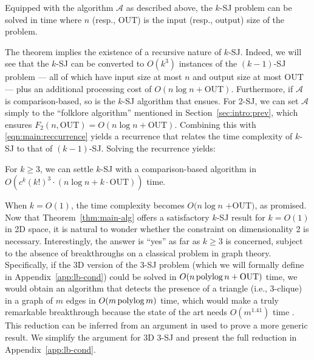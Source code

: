 \documentclass[sigconf]{acmart}
\def\A{\mathcal{A}}
\def\out{\mathrm{OUT}}
\begin{document}
\begin{theorem} \label{thm:main-recur}
    Equipped with the algorithm $\A$ as described above, the $k$-SJ problem can be solved in time
    \myeqn{
        O(k^3) \cdot \big( F_{k-1}(n, \out) + n \log n + k \cdot \out \big)
        \label{eqn:main:reccurrence}
    }
    where $n$ (resp., $\out$) is the input (resp., output) size of the problem.
\end{theorem}

The theorem implies the existence of a recursive nature of $k$-SJ. Indeed, we will see that the $k$-SJ can be converted to $O(k^3)$ instances of the $(k-1)$-SJ problem --- all of which have input size at most $n$ and output size at most $\out$ --- plus an additional processing cost of $O(n \log n + \out)$. Furthermore, if $\A$ is comparison-based, so is the $k$-SJ algorithm that ensues. For 2-SJ, we can set $\A$ simply to the ``folklore algorithm'' mentioned in Section~\ref{sec:intro:prev}, which ensures $F_2(n, \out) = O(n \log n + \out)$. Combining this with \eqref{eqn:main:reccurrence} yields a recurrence that relates the time complexity of $k$-SJ to that of $(k-1)$-SJ. Solving the recurrence yields:

\begin{theorem} \label{thm:main-alg}
    For $k \ge 3$, we can settle $k$-SJ with a comparison-based algorithm in $O( c^k (k!)^3 \cdot (n \log n + k \cdot \out))$ time.
\end{theorem}


When $k = O(1)$, the time complexity becomes $O(n \log n$ $+ \out)$, as promised. Now that Theorem~\ref{thm:main-alg} offers a satisfactory $k$-SJ result for $k = O(1)$ in 2D space, it is natural to wonder whether the constraint on dimensionality 2 is necessary. Interestingly, the answer is ``yes'' as far as $k \ge 3$ is concerned, subject to the absence of breakthroughs on a classical problem in graph theory. Specifically, if the 3D version of the 3-SJ problem (which we will formally define in Appendix~\ref{app:lb-cond}) could be solved in $O(n \polylog n + \out)$ time, we would obtain an algorithm that detects the presence of a triangle (i.e., 3-clique) in a graph of $m$ edges in $O(m \operatorname*{polylog} m)$ time, which would make a truly remarkable breakthrough because the state of the art needs $O(m^{1.41})$ time \cite{ayz97}. This reduction can be inferred from an argument in \cite{kcko22} used to prove a more generic result. We simplify the argument for 3D 3-SJ and present the full reduction in Appendix~\ref{app:lb-cond}.
\end{document}
